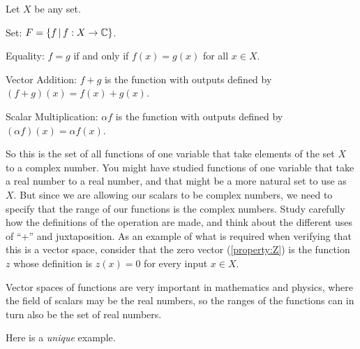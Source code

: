 \documentclass{ximera}
\begin{document}
\begin{example}
Let $X$ be any set.

Set: $F=\left\lbrace f\,\middle|\,f:X\rightarrow\mathbb{C}\right\rbrace$.

Equality: $f=g$ if and only if $f(x)=g(x)$ for all $x\in X$.

Vector Addition: $f+g$ is the function with outputs defined by
$(f+g)(x)=f(x)+g(x)$.

Scalar Multiplication: $\alpha f$ is the function with outputs defined
by $(\alpha f)(x)=\alpha f(x)$.

So this is the set of all functions of one variable that take elements
of the set $X$ to a complex number.  You might have studied functions
of one variable that take a real number to a real number, and that
might be a more natural set to use as $X$.  But since we are allowing
our scalars to be complex numbers, we need to specify that the range
of our functions is the complex numbers.  Study carefully how the
definitions of the operation are made, and think about the different
uses of ``+'' and juxtaposition.  As an example of what is required
when verifying that this is a vector space, consider that the zero
vector (\ref{property:Z}) is the function $z$ whose definition is
$z(x)=0$ for every input $x\in X$.

Vector spaces of functions are very important in mathematics and
physics, where the field of scalars may be the real numbers, so the
ranges of the functions can in turn also be the set of real numbers.
\end{example}

Here is a \textit{unique} example.
\end{document}
